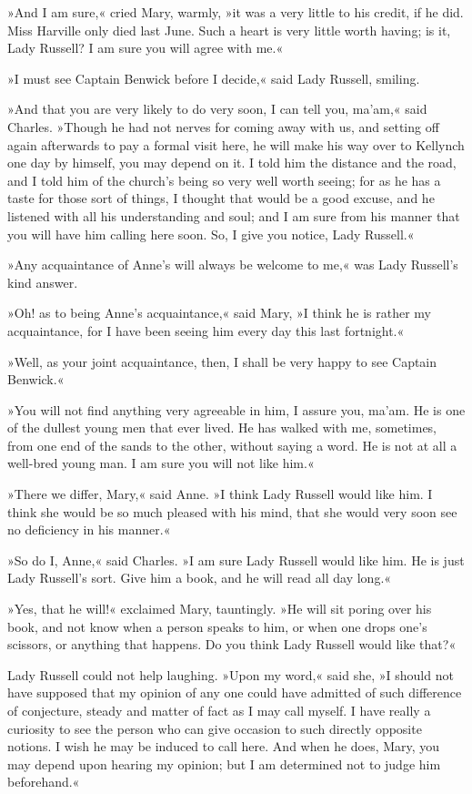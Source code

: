 »And I am sure,« cried Mary, warmly, »it was a very little to his credit, if he did. Miss Harville only died last June. Such a heart is very little worth having; is it, Lady Russell? I am sure you will agree with me.«

»I must see Captain Benwick before I decide,« said Lady Russell, smiling.

»And that you are very likely to do very soon, I can tell you, ma'am,« said Charles. »Though he had not nerves for coming away with us, and setting off again afterwards to pay a formal visit here, he will make his way over to Kellynch one day by himself, you may depend on it. I told him the distance and the road, and I told him of the church's being so very well worth seeing; for as he has a taste for those sort of things, I thought that would be a good excuse, and he listened with all his understanding and soul; and I am sure from his manner that you will have him calling here soon. So, I give you notice, Lady Russell.«

»Any acquaintance of Anne's will always be welcome to me,« was Lady Russell's kind answer.

»Oh! as to being Anne's acquaintance,« said Mary, »I think he is rather my acquaintance, for I have been seeing him every day this last fortnight.«

»Well, as your joint acquaintance, then, I shall be very happy to see Captain Benwick.«

»You will not find anything very agreeable in him, I assure you, ma'am. He is one of the dullest young men that ever lived. He has walked with me, sometimes, from one end of the sands to the other, without saying a word. He is not at all a well-bred young man. I am sure you will not like him.«

»There we differ, Mary,« said Anne. »I think Lady Russell would like him. I think she would be so much pleased with his mind, that she would very soon see no deficiency in his manner.«

»So do I, Anne,« said Charles. »I am sure Lady Russell would like him. He is just Lady Russell's sort. Give him a book, and he will read all day long.«

»Yes, that he will!« exclaimed Mary, tauntingly. »He will sit poring over his book, and not know when a person speaks to him, or when one drops one's scissors, or anything that happens. Do you think Lady Russell would like that?«

Lady Russell could not help laughing. »Upon my word,« said she, »I should not have supposed that my opinion of any one could have admitted of such difference of conjecture, steady and matter of fact as I may call myself. I have really a curiosity to see the person who can give occasion to such directly opposite notions. I wish he may be induced to call here. And when he does, Mary, you may depend upon hearing my opinion; but I am determined not to judge him beforehand.«

